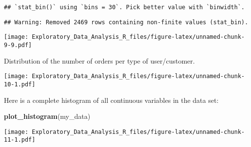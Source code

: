 \documentclass[]{article}
\newenvironment{Shaded}{\begin{snugshade}}{\end{snugshade}}
\newcommand{\KeywordTok}[1]{\textcolor[rgb]{0.13,0.29,0.53}{\textbf{{#1}}}}
\newcommand{\DataTypeTok}[1]{\textcolor[rgb]{0.13,0.29,0.53}{{#1}}}
\newcommand{\StringTok}[1]{\textcolor[rgb]{0.31,0.60,0.02}{{#1}}}
\newcommand{\OtherTok}[1]{\textcolor[rgb]{0.56,0.35,0.01}{{#1}}}
\newcommand{\NormalTok}[1]{{#1}}
\begin{document}
\begin{verbatim}
## `stat_bin()` using `bins = 30`. Pick better value with `binwidth`.
\end{verbatim}

\begin{verbatim}
## Warning: Removed 2469 rows containing non-finite values (stat_bin).
\end{verbatim}

\texttt{[image: Exploratory\_Data\_Analysis\_R\_files/figure-latex/unnamed-chunk-9-9.pdf]}

Distribution of the number of orders per type of user/customer.

\begin{Shaded}
\end{Shaded}

\texttt{[image: Exploratory\_Data\_Analysis\_R\_files/figure-latex/unnamed-chunk-10-1.pdf]}

Here is a complete histogram of all continuous variables in the data
set:

\begin{Shaded}
\begin{Highlighting}[]
\KeywordTok{plot_histogram}\NormalTok{(my_data)}
\end{Highlighting}
\end{Shaded}

\texttt{[image: Exploratory\_Data\_Analysis\_R\_files/figure-latex/unnamed-chunk-11-1.pdf]}
\end{document}
